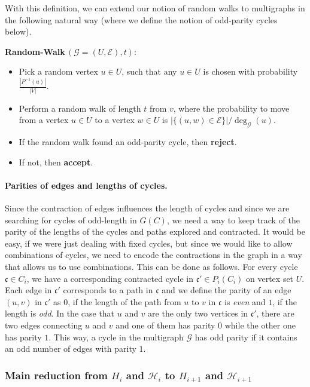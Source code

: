 \documentclass[11pt]{article}
\newcommand{\RW}{{\bf Random-Walk}}
\begin{document}
With this definition, we can extend our notion of random walks to multigraphs in the following natural way (where we define the notion of odd-parity cycles below).

\medskip
\begin{algo}
\RW\,${(\mathcal{G}= (U,\mathcal{E}),t)}$:
\begin{itemize}
\item Pick a random vertex $u \in U$, such that any $u \in U$ is chosen with probability $\frac{|P^{-1}(u)|}{|V|}$.
\item  Perform a random walk of length $t$ from $v$, where the probability to move from a vertex $u \in U$ to a vertex $w\in U$ is $|\{(u,w)\in \mathcal{E}\}| / \deg_{\mathcal{G}}(u)$.
\item  If the random walk found an odd-parity cycle, then \textbf{reject}.
\item  If not, then \textbf{accept}.
\end{itemize}
\end{algo}


\paragraph{Parities of edges and lengths of cycles.}

Since the contraction of edges influences the length of cycles and since we are searching for cycles of odd-length in $G(C)$, we need a way to keep track of the parity of the lengths of the cycles and paths explored and contracted. It would be easy, if we were just dealing with fixed cycles, but since we would like to allow combinations of cycles, we need to encode the contractions in the graph in a way that allows us to use combinations. This can be done as follows. For every cycle $\mathfrak{c} \in C_i$, we have a corresponding contracted cycle in $\mathfrak{c}' \in P_i(C_i)$ on vertex set $U$. Each edge in $\mathfrak{c}'$ corresponds to a path in $\mathfrak{c}$ and we define the parity of an edge $(u,v)$ in $\mathfrak{c}'$ as $0$, if the length of the path from $u$ to $v$ in $\mathfrak{c}$ is \emph{even} and $1$, if the length is \emph{odd}. In the case that $u$ and $v$ are the only two vertices in $\mathfrak{c}'$, there are two edges connecting $u$ and $v$ and one of them has parity $0$ while the other one has parity $1$. This way, a cycle in the multigraph $\mathcal{G}$ has odd parity if it contains an odd number of edges with parity $1$.



\subsubsection{Main reduction from $H_i$ and $\mathcal H_i$ to $H_{i+1}$ and $\mathcal H_{i+1}$}
\label{subsec:main-reduction}
\end{document}
